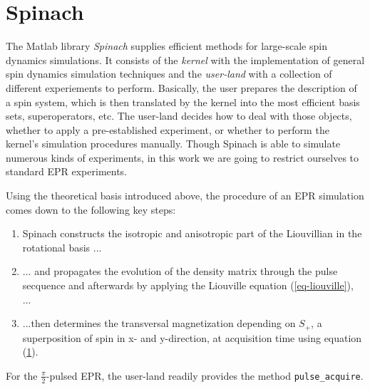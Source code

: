 \documentclass[11.5pt,a4paper]{article}
\begin{document}

\section{Spinach}
The Matlab library \emph{Spinach} supplies efficient methods for large-scale spin dynamics simulations. It consists of the \emph{kernel} with the implementation of general spin dynamics simulation techniques and the \emph{user-land} with a collection of different experiements to perform. Basically, the user prepares the description of a spin system, which is then translated by the kernel into the most efficient basis sets, superoperators, etc. The user-land decides how to deal with those objects, whether to apply a pre-established experiment, or whether to perform the kernel's simulation procedures manually. Though Spinach is able to simulate numerous kinds of experiments, in this work we are going to restrict ourselves to standard EPR experiments. 

Using the theoretical basis introduced above, the procedure of an EPR simulation comes down to the following key steps:
\begin{enumerate}
 \item Spinach constructs the isotropic and anisotropic part of the Liouvillian in the rotational basis ...
 \item ... and propagates the evolution of the density matrix through the pulse secquence and afterwards by applying the Liouville equation (\ref{eq-liouville}), ...
 \item ...then determines the transversal magnetization depending on $S_+$, a superposition of spin in x- and y-direction, at acquisition time using equation (\ref{}).
\end{enumerate}

For the $\tfrac{\pi}{2}$-pulsed EPR, the user-land readily provides the method \verb|pulse_acquire|. 
\end{document}
